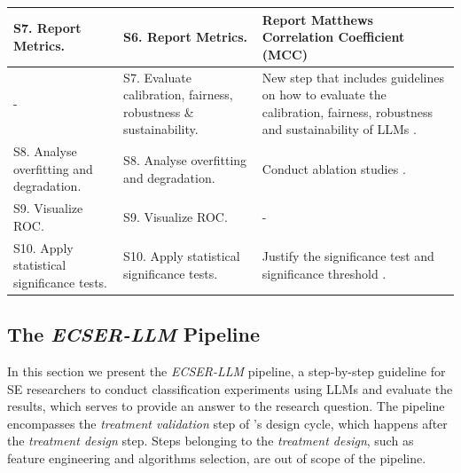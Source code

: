 \documentclass[a4paper]{article}
\newcommand{\newecser}{\textit{ECSER-LLM} }
\begin{document}
\begin{table}[H]
\begin{tabularx}{\textwidth}{|p{3cm}|p{3.5cm}|X|}
		S7. Report Metrics.
		& S6. Report Metrics.
		&  Report Matthews Correlation Coefficient (MCC) \cite{Chicco2020,Foody2023,Yao2020} \\ \hline

		- 
		& S7. Evaluate calibration, fairness, robustness \& sustainability.
		& New step that includes guidelines on how to evaluate the calibration, fairness, robustness and sustainability of LLMs  \cite{chang2023,liu2024}. \\ \hline
		
		S8. Analyse overfitting and degradation.
		& S8. Analyse overfitting and degradation.
		& Conduct ablation studies \cite{meyes2019ablation}. \\ \hline
		
		S9. Visualize ROC.
		& S9. Visualize ROC.
		& - \\ \hline
		
		S10. Apply statistical significance tests.
		& S10. Apply statistical significance tests.
		& Justify the significance test and significance threshold \cite{benjamin2018significance,amrhein2017significance}. \\ \hline
	\end{tabularx}
	\label{table:additions}
\end{table}



\subsection{The \newecser Pipeline}
\label{ECSER-LLM}
In this section we present the \newecser pipeline, a step-by-step guideline for SE researchers to conduct classification experiments using LLMs and evaluate the results, which serves to provide an answer to the research question. The pipeline encompasses the \textit{treatment validation} step of \textcite{Wieringa2014}'s design cycle, which happens after the \textit{treatment design} step. Steps belonging to the \textit{treatment design}, such as feature engineering and algorithms selection, are out of scope of the pipeline. 
\end{document}
